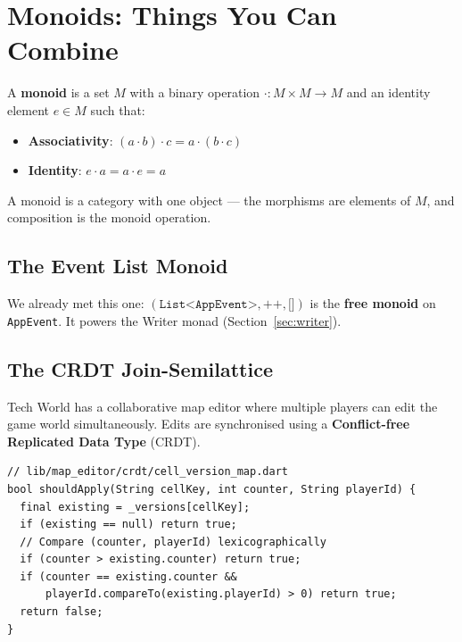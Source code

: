 \documentclass[12pt,a4paper]{article}
\theoremstyle{definition}
\theoremstyle{plain}
\theoremstyle{remark}
\begin{document}
\section{Monoids: Things You Can Combine}
\label{sec:monoids}

\begin{formal}
A \textbf{monoid} is a set $M$ with a binary operation
$\cdot \colon M \times M \to M$ and an identity element $e \in M$ such that:
\begin{itemize}
  \item \textbf{Associativity}: $(a \cdot b) \cdot c = a \cdot (b \cdot c)$
  \item \textbf{Identity}: $e \cdot a = a \cdot e = a$
\end{itemize}
A monoid is a category with one object --- the morphisms are elements of $M$,
and composition is the monoid operation.
\end{formal}

\subsection{The Event List Monoid}

We already met this one: $(\texttt{List<AppEvent>}, \texttt{++}, \texttt{[]})$
is the \textbf{free monoid} on \texttt{AppEvent}. It powers the Writer monad
(Section~\ref{sec:writer}).

\subsection{The CRDT Join-Semilattice}
\label{sec:crdt}

Tech World has a collaborative map editor where multiple players can edit
the game world simultaneously. Edits are synchronised using a
\textbf{Conflict-free Replicated Data Type} (CRDT).

\begin{lstlisting}
// lib/map_editor/crdt/cell_version_map.dart
bool shouldApply(String cellKey, int counter, String playerId) {
  final existing = _versions[cellKey];
  if (existing == null) return true;
  // Compare (counter, playerId) lexicographically
  if (counter > existing.counter) return true;
  if (counter == existing.counter &&
      playerId.compareTo(existing.playerId) > 0) return true;
  return false;
}
\end{lstlisting}
\end{document}
